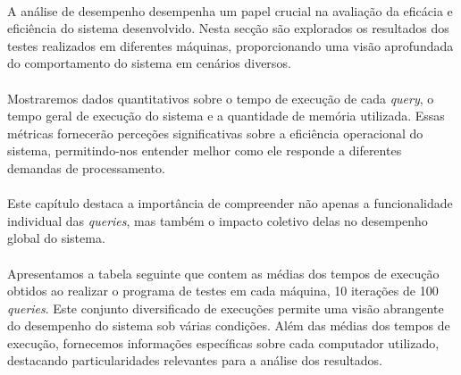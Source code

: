 \documentclass{article}
\begin{document}
\paragraph{}A análise de desempenho desempenha um papel crucial na avaliação da eficácia e eficiência do sistema desenvolvido. Nesta secção são explorados os resultados dos testes realizados em diferentes máquinas, proporcionando uma visão aprofundada do comportamento do sistema em cenários diversos.
\vspace{-0.3cm}
\paragraph{}Mostraremos dados quantitativos sobre o tempo de execução de cada \textit{query}, o tempo geral de execução do sistema e a quantidade de memória utilizada. Essas métricas fornecerão perceções significativas sobre a eficiência operacional do sistema, permitindo-nos entender melhor como ele responde a diferentes demandas de processamento.
\vspace{-0.3cm}
\paragraph{}Este capítulo destaca a importância de compreender não apenas a funcionalidade individual das \textit{queries}, mas também o impacto coletivo delas no desempenho global do sistema.
\vspace{-0.3cm}
\paragraph{}Apresentamos a tabela seguinte que contem as médias dos tempos de execução obtidos ao realizar o programa de testes em cada máquina, 10 iterações de 100 \textit{queries}. Este conjunto diversificado de execuções permite uma visão abrangente do desempenho do sistema sob várias condições. Além das médias dos tempos de execução, fornecemos informações específicas sobre cada computador utilizado, destacando particularidades relevantes para a análise dos resultados.
\end{document}

